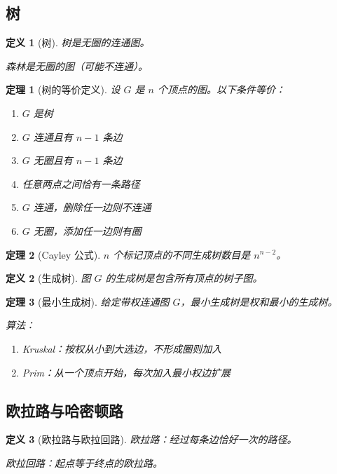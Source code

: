 \documentclass[12pt]{article}
\newtheorem{theorem}{定理}[section]
\newtheorem{definition}{定义}[section]
\begin{document}
\subsection{树}

\begin{definition}[树]
树是无圈的连通图。

森林是无圈的图（可能不连通）。
\end{definition}

\begin{theorem}[树的等价定义]
设 $G$ 是 $n$ 个顶点的图。以下条件等价：
\begin{enumerate}
\item $G$ 是树
\item $G$ 连通且有 $n-1$ 条边
\item $G$ 无圈且有 $n-1$ 条边
\item 任意两点之间恰有一条路径
\item $G$ 连通，删除任一边则不连通
\item $G$ 无圈，添加任一边则有圈
\end{enumerate}
\end{theorem}

\begin{theorem}[Cayley 公式]
$n$ 个标记顶点的不同生成树数目是 $n^{n-2}$。
\end{theorem}

\begin{definition}[生成树]
图 $G$ 的生成树是包含所有顶点的树子图。
\end{definition}

\begin{theorem}[最小生成树]
给定带权连通图 $G$，最小生成树是权和最小的生成树。

算法：
\begin{enumerate}
\item Kruskal：按权从小到大选边，不形成圈则加入
\item Prim：从一个顶点开始，每次加入最小权边扩展
\end{enumerate}
\end{theorem}

\subsection{欧拉路与哈密顿路}

\begin{definition}[欧拉路与欧拉回路]
欧拉路：经过每条边恰好一次的路径。

欧拉回路：起点等于终点的欧拉路。
\end{definition}
\end{document}
